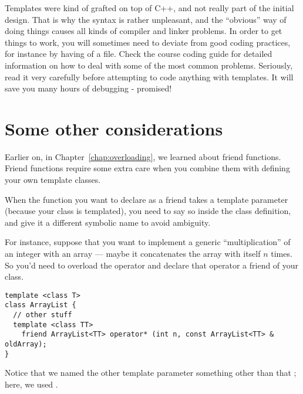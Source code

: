 Templates were kind of grafted on top of C++, and not really part of
the initial design. That is why the syntax is rather unpleasant, and
the ``obvious'' way of doing things causes all kinds of compiler and
linker problems. In order to get things to work, you will sometimes
need to deviate from good coding practices, for instance by having 
 of a  file.
Check the course coding guide for detailed information
on how to deal with some of the most common problems.
Seriously, read it very carefully before attempting to code anything
with templates. It will save you many hours of debugging - promised!

\section{Some other considerations}
Earlier on, in Chapter~\ref{chap:overloading}, we learned about friend
functions. Friend functions require some extra care when you combine
them with defining your own template classes.

When the function you want to declare as a friend takes a template
parameter (because your class is templated), you need to say so inside
the class definition, and give it a different symbolic name to avoid
ambiguity. 

For instance, suppose that you want to implement a generic
``multiplication'' of an integer with an array --- maybe it
concatenates the array with itself $n$ times.
So you'd need to overload the \code{*} operator and declare that
operator a friend of your  class.

\begin{verbatim}
template <class T>
class ArrayList { 
  // other stuff
  template <class TT>
    friend ArrayList<TT> operator* (int n, const ArrayList<TT> & oldArray);
}
\end{verbatim}

Notice that we named the other template parameter something other than
that ; here, we used .

